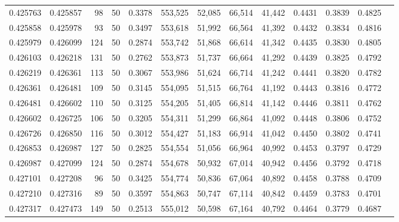 \begin{tabular}{rrrrrrrrrrrrr}
0.425763 & 0.425857 &    98 &  50 &                                     0.3378 & 553,525 &  52,085 &  66,514 &  41,442 & 0.4431 & 0.3839 & 0.4825 \\
0.425858 & 0.425978 &    93 &  50 &                                     0.3497 & 553,618 &  51,992 &  66,564 &  41,392 & 0.4432 & 0.3834 & 0.4816 \\
0.425979 & 0.426099 &   124 &  50 &                                     0.2874 & 553,742 &  51,868 &  66,614 &  41,342 & 0.4435 & 0.3830 & 0.4805 \\
0.426103 & 0.426218 &   131 &  50 &                                     0.2762 & 553,873 &  51,737 &  66,664 &  41,292 & 0.4439 & 0.3825 & 0.4792 \\
0.426219 & 0.426361 &   113 &  50 &                                     0.3067 & 553,986 &  51,624 &  66,714 &  41,242 & 0.4441 & 0.3820 & 0.4782 \\
0.426361 & 0.426481 &   109 &  50 &                                     0.3145 & 554,095 &  51,515 &  66,764 &  41,192 & 0.4443 & 0.3816 & 0.4772 \\
0.426481 & 0.426602 &   110 &  50 &                                     0.3125 & 554,205 &  51,405 &  66,814 &  41,142 & 0.4446 & 0.3811 & 0.4762 \\
0.426602 & 0.426725 &   106 &  50 &                                     0.3205 & 554,311 &  51,299 &  66,864 &  41,092 & 0.4448 & 0.3806 & 0.4752 \\
0.426726 & 0.426850 &   116 &  50 &                                     0.3012 & 554,427 &  51,183 &  66,914 &  41,042 & 0.4450 & 0.3802 & 0.4741 \\
0.426853 & 0.426987 &   127 &  50 &                                     0.2825 & 554,554 &  51,056 &  66,964 &  40,992 & 0.4453 & 0.3797 & 0.4729 \\
0.426987 & 0.427099 &   124 &  50 &                                     0.2874 & 554,678 &  50,932 &  67,014 &  40,942 & 0.4456 & 0.3792 & 0.4718 \\
0.427101 & 0.427208 &    96 &  50 &                                     0.3425 & 554,774 &  50,836 &  67,064 &  40,892 & 0.4458 & 0.3788 & 0.4709 \\
0.427210 & 0.427316 &    89 &  50 &                                     0.3597 & 554,863 &  50,747 &  67,114 &  40,842 & 0.4459 & 0.3783 & 0.4701 \\
0.427317 & 0.427473 &   149 &  50 &                                     0.2513 & 555,012 &  50,598 &  67,164 &  40,792 & 0.4464 & 0.3779 & 0.4687 \\

\end{tabular}
